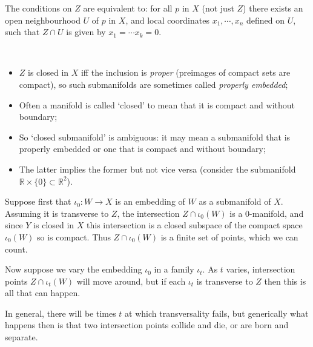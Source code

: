 \documentclass[a4paper,11pt]{article}
\begin{document}
	\begin{defi}
		The conditions on $Z$ are equivalent to: for all $p$ in $X$ (not just $Z$) there exists an open neighbourhood $U$ of $p$ in $X$, and local coordinates $x_1, \cdots, x_n$ defined on $U$, such that $Z \cap U$ is given by $x_1 = \cdots x_k = 0$.
	\end{defi}

	\begin{rmk}
		\ 
		\begin{itemize}
			\item $Z$ is closed in $X$ iff the inclusion is \emph{proper} (preimages of compact sets are compact), so such submanifolds are sometimes called \emph{properly embedded};
			\item Often a manifold is called `closed' to mean that it is compact and without boundary;
			\item So `closed submanifold' is ambiguous: it may mean a submanifold that is properly embedded or one that is compact and without boundary;
			\item The latter implies the former but not vice versa (consider the submanifold $\mathbb{R} \times \{0\} \subset \mathbb{R}^2$).
		\end{itemize}
	\end{rmk}

	Suppose first that $\iota_0 : W \to X$ is an embedding of $W$ as a submanifold of $X$. Assuming it is transverse to $Z$, the intersection $Z \cap \iota_0(W)$ is a 0-manifold, and since $Y$ is closed in $X$ this intersection is a closed subspace of the compact space $\iota_0(W)$ so is compact. Thus $Z \cap \iota_0(W)$ is a finite set of points, which we can count.


	Now suppose we vary the embedding $\iota_0$ in a family $\iota_t$. As $t$ varies, intersection points $Z \cap \iota_t(W)$ will move around, but if each $\iota_t$ is transverse to $Z$ then this is all that can happen.

	In general, there will be times $t$ at which transversality fails, but generically what happens then is that two intersection points collide and die, or are born and separate.
\end{document}
